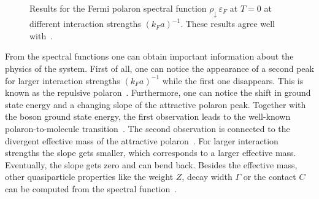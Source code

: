 \begin{figure}[b]
	\centering
	\caption[Spectral functions of Fermi polaron at different interaction strengths]{Results for the Fermi polaron spectral function $\rho_{\downarrow}\,\varepsilon_F$ at $T=0$ at different interaction strengths $(k_Fa)^{-1}$. These results agree well with~\cite{Schmidt2011,Kamikado2017}.}
	\label{fig:specs-comparison}
\end{figure}

From the spectral functions one can obtain important information about the physics of the system. First of all, one can notice the appearance of a second peak for larger interaction strengths $(k_Fa)^{-1}$ while the first one disappears. This is known as the repulsive polaron~\cite{Scazza2022}. Furthermore, one can notice the shift in ground state energy and a changing slope of the attractive polaron peak. Together with the boson ground state energy, the first observation leads to the well-known polaron-to-molecule transition~\cite{Schmidt2011}. The second observation is connected to the divergent effective mass of the attractive polaron~\cite{Vlietinck2013}. For larger interaction strengths the slope gets smaller, which corresponds to a larger effective mass. Eventually, the slope gets zero and can bend back. Besides the effective mass, other quasiparticle properties like the weight $Z$, decay width $\Gamma$ or the contact $C$ can be computed from the spectral function~\cite{Scazza2022}.

